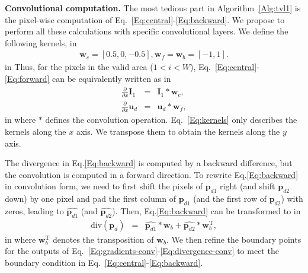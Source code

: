 \documentclass[10pt,twocolumn,letterpaper]{article}
\def\Vec#1{{\boldsymbol{#1}}}
\def\Mat#1{{\boldsymbol{#1}}}
\begin{document}
\textbf{Convolutional computation.}
The most tedious part in Algorithm~\ref{Alg:tvl1} is the pixel-wise computation of Eq.~\eqref{Eq:central}-\eqref{Eq:backward}.
We propose to perform all these calculations with specific convolutional layers.
We define the following kernels,
 in
\begin{eqnarray}
\label{Eq:kernels}
\Vec{w}_c = [0.5, 0, -0.5], \Vec{w}_f = \Vec{w}_b = [-1, 1].
\end{eqnarray}
 in
\noindent
Thus, for the pixels in the valid area ($1<i<W$), Eq.~\eqref{Eq:central}-\eqref{Eq:forward} can be equivalently written as
 in
\begin{eqnarray}
\label{Eq:gradients-conv}
\frac{\partial}{\partial x}\Mat{I}_1 &=&  \Mat{I}_1\ast \Vec{w}_c, \\
\frac{\partial}{\partial x}\Vec{u}_d &=&   \Vec{u}_d\ast \Vec{w}_f,
\end{eqnarray}
 in \noindent
where $\ast$ defines the convolution operation. Eq.~\eqref{Eq:kernels} only describes the kernels along the $x$ axis. We transpose them  to obtain the kernels along the $y$ axis.

The divergence in Eq.\eqref{Eq:backward} is computed by a backward difference, but the convolution is computed in a forward direction. To rewrite Eq.\eqref{Eq:backward} in convolution form, we need to first shift the pixels of $\Vec{p}_{d1}$ right (and shift $\Vec{p}_{d2}$ down) by one pixel and pad the first column of $\Vec{p}_{d1}$ (and the first row of $\Vec{p}_{d2}$) with zeros, leading to $\hat{\Vec{p}_{d1}}$ (and $\hat{\Vec{p}_{d2}}$). Then, Eq.\eqref{Eq:backward} can be transformed to
 in
\begin{eqnarray}
\label{Eq:divergence-conv}
\mathrm{div}(\Vec{p}_d) &=&   \hat{\Vec{p}_{d1}}\ast \Vec{w}_b + \hat{\Vec{p}_{d2}}\ast \Vec{w}_b^{\mathrm{T}},
\end{eqnarray}
 in \noindent
where $\Vec{w}_b^{\mathrm{T}}$ denotes the transposition of $\Vec{w}_b$.
We then refine the boundary points for the outputs of Eq.~\eqref{Eq:gradients-conv}-\eqref{Eq:divergence-conv} to meet the boundary condition in Eq.~\eqref{Eq:central}-\eqref{Eq:backward}.
\end{document}
